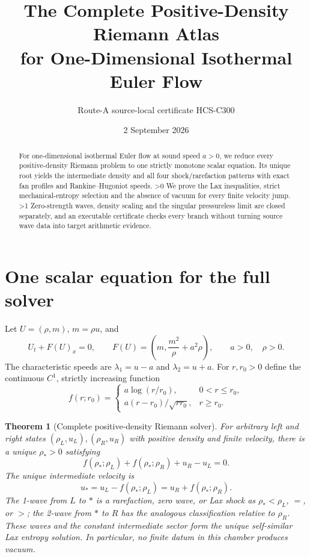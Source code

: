 \documentclass[10pt]{article}
\title{The Complete Positive-Density Riemann Atlas\\
for One-Dimensional Isothermal Euler Flow}
\author{Route-A source-local certificate HCS-C300}
\date{2 September 2026}
\providecommand{\CRevisionRound}{2}
\newtheorem{theorem}{Theorem}
\begin{document}
\maketitle

\begin{abstract}
For one-dimensional isothermal Euler flow at sound speed $a>0$, we reduce
every positive-density Riemann problem to one strictly monotone scalar
equation.  Its unique root yields the intermediate density and all four
shock/rarefaction patterns with exact fan profiles and Rankine--Hugoniot
speeds.
\ifnum\CRevisionRound>0
We prove the Lax inequalities, strict mechanical-entropy selection and the
absence of vacuum for every finite velocity jump.
\fi
\ifnum\CRevisionRound>1
Zero-strength waves, density scaling and the singular pressureless limit are
closed separately, and an executable certificate checks every branch without
turning source wave data into target arithmetic evidence.
\fi
\end{abstract}

\section{One scalar equation for the full solver}
Let $U=(\rho,m)$, $m=\rho u$, and
\begin{equation}\label{eq:euler}
 U_t+F(U)_x=0,
 \qquad F(U)=\left(m,\frac{m^2}{\rho}+a^2\rho\right),
 \qquad a>0,\quad \rho>0.
\end{equation}
The characteristic speeds are $\lambda_1=u-a$ and $\lambda_2=u+a$.
For $r,r_0>0$ define the continuous $C^1$, strictly increasing function
\begin{equation}\label{eq:f}
 f(r;r_0)=
 \begin{cases}
 a\log(r/r_0),&0<r\le r_0,\\[2pt]
 a(r-r_0)/\sqrt{rr_0},&r\ge r_0.
 \end{cases}
\end{equation}

\begin{theorem}[Complete positive-density Riemann solver]\label{thm:main}
For arbitrary left and right states $(\rho_L,u_L),(\rho_R,u_R)$ with positive
density and finite velocity, there is a unique $\rho_*>0$ satisfying
\begin{equation}\label{eq:root}
 f(\rho_*;\rho_L)+f(\rho_*;\rho_R)+u_R-u_L=0.
\end{equation}
The unique intermediate velocity is
\begin{equation}\label{eq:ustar}
 u_*=u_L-f(\rho_*;\rho_L)=u_R+f(\rho_*;\rho_R).
\end{equation}
The 1-wave from $L$ to $*$ is a rarefaction, zero wave, or Lax shock as
$\rho_*<\rho_L$, $=$, or $>$; the 2-wave from $*$ to $R$ has the analogous
classification relative to $\rho_R$.  These waves and the constant
intermediate sector form the unique self-similar Lax entropy solution.
In particular, no finite datum in this chamber produces vacuum.
\end{theorem}
\end{document}
